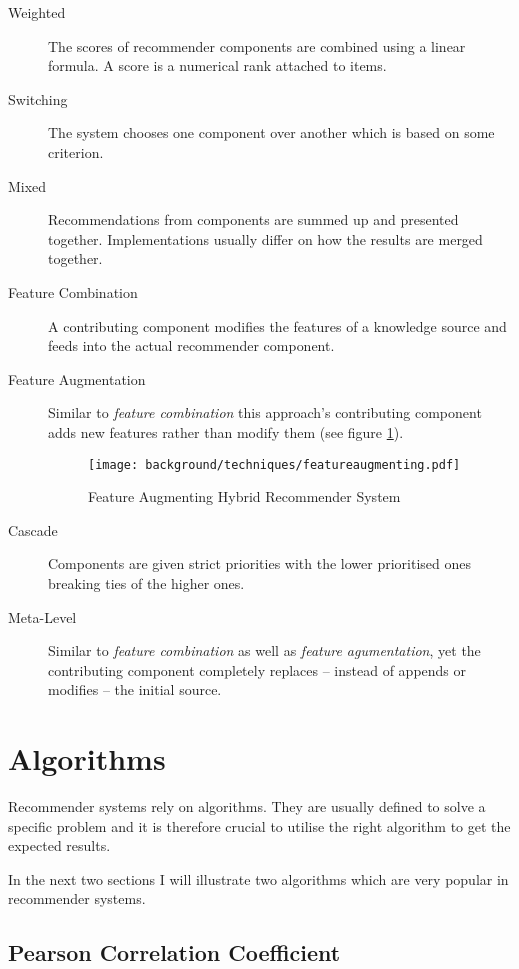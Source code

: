 \begin{description}
    \item[Weighted] The scores of recommender components are combined using a linear formula. A score is a numerical rank attached to items.
    \item[Switching] The system chooses one component over another which is based on some criterion.
    \item[Mixed] Recommendations from components are summed up and presented together. Implementations usually differ on how the results are merged together.
    \item[Feature Combination] A contributing component modifies the features of a knowledge source and feeds into the actual recommender component.
    \item[Feature Augmentation] Similar to \textit{feature combination} this approach's contributing component adds new features rather than modify them (see figure \ref{fig:featureaugmenting}).

    \begin{figure}[ht]
        \texttt{[image: background/techniques/featureaugmenting.pdf]}
        \caption{Feature Augmenting Hybrid Recommender System}
        \label{fig:featureaugmenting}
    \end{figure}

    \item[Cascade] Components are given strict priorities with the lower prioritised ones breaking ties of the higher ones.
    \item[Meta-Level] Similar to \textit{feature combination} as well as \textit{feature agumentation}, yet the contributing component completely replaces -- instead of appends or modifies -- the initial source.
\end{description}



\section{Algorithms}

Recommender systems rely on algorithms. They are usually defined to solve a specific problem and it is therefore crucial to utilise the right algorithm to get the expected results.

In the next two sections I will illustrate two algorithms which are very popular in recommender systems.

\subsection{Pearson Correlation Coefficient}

